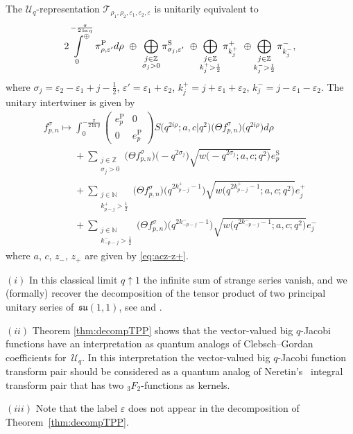 \documentclass[pdftex]{sigma}
\numberwithin{equation}{section}
\numberwithin{theorem}{section}
\numberwithin{proposition}{section}
\numberwithin{lemma}{section}
\numberwithin{corollary}{section}
\numberwithin{definition}{section}
\numberwithin{example}{section}
\numberwithin{remark}{section}
\numberwithin{note}{section}
\newcommand{\N}{\mathbb N}
\newcommand{\Z}{\mathbb Z}
\newcommand{\eps}{\varepsilon}
\newcommand{\dirint}[2]{\sideset{}{^\oplus}\int\limits_{#1\ }^{\ \ #2}}
\newcommand{\su}{\mathfrak{su}}
\newcommand{\U}{\mathcal U}
\begin{document}
\begin{theorem} \label{thm:decompTPP}
The $\U_q$-representation $\mathcal T_{\rho_1,\rho_2,\eps_1,\eps_2,\eps}$ is unitarily equivalent to
\[
2\dirint{0}{-\frac{\pi}{2 \ln q}} \pi^{\mathrm P}_{\rho,\eps'} d\rho\ \oplus\ \bigoplus_{\substack{j\in\Z\\ \sigma_j>0}} \pi_{\sigma_j,\eps'}^{\mathrm S} \ \oplus \bigoplus_{\substack{j\in\Z \\ k_j^+>\frac12}} \pi_{k_j^+}^+ \ \oplus \bigoplus_{\substack{j\in\Z \\ k_j^->\frac12}} \pi_{k_j^-}^-,
\]
where $\sigma_j=\eps_2-\eps_1+j-\frac12$, $\eps'=\eps_1+\eps_2$, $k_j^+=j+\eps_1+\eps_2$, $k_j^-=j-\eps_1-\eps_2$.
The unitary intertwiner is given by
\begin{gather*}
f_{p,n}^\sigma  \mapsto  \int_{0}^{-\frac{\pi}{2\ln q}}
\begin{pmatrix}
e_p^{\mathrm P} & 0\\
0 & e_p^{\mathrm P}
\end{pmatrix}
S\big(q^{2i\rho};a,c|q^2\big)\big(\Theta f_{p,n}^\sigma\big)\big(q^{2i\rho}\big) d\rho \\
\phantom{f_{p,n}^\sigma  \mapsto}{}
 + \sum_{\substack{j \in \Z\\ \sigma_j>0}} \big(\Theta f_{p,n}^\sigma\big)\big({-}q^{2\sigma_j}\big) \sqrt{w\big({-}q^{2\sigma_j};a,c;q^2\big)}   e_p^{\mathrm S} \\
\phantom{f_{p,n}^\sigma  \mapsto}{}
 + \sum_{\substack{j \in \N\\k_{p-j}^+>\frac12}} \big(\Theta f_{p,n}^\sigma \big)\big(q^{2k_{p-j}^+-1}\big) \sqrt{w\big(q^{2k_{p-j}^+-1};a,c;q^2\big)}  e_j^+ \\
\phantom{f_{p,n}^\sigma  \mapsto}{}
 + \sum_{\substack{j \in \N\\k_{-p-j}^->\frac12}} \big(\Theta f_{p,n}^\sigma \big)\big(q^{2k_{-p-j}^--1}\big) \sqrt{w\big(q^{2k_{-p-j}^--1};a,c;q^2\big)}  e_j^-
\end{gather*}
where $a$, $c$, $z_-$, $z_+$ are given by \eqref{eq:acz-z+}.
\end{theorem}

\begin{remark}
$(i)$ In this classical limit $q\uparrow 1$ the inf\/inite sum of strange series vanish, and we (formally) recover the decomposition of the tensor product of two principal unitary series of~$\su(1,1)$, see \cite[Theorem~II]{Pu} and \cite[Theorem~4.6]{Re}.

$(ii)$ Theorem \ref{thm:decompTPP} shows that the vector-valued big $q$-Jacobi functions have an interpretation as quantum analogs of Clebsch--Gordan coef\/f\/icients for~$\U_q$. In this interpretation the vector-valued big $q$-Jacobi function transform pair should be considered as a quantum analog of Neretin's~\cite{Ne} integral transform pair that has two $_3F_2$-functions as kernels.

$(iii)$ Note that the label $\eps$ does not appear in the decomposition of Theorem~\ref{thm:decompTPP}.
\end{remark}
\end{document}
